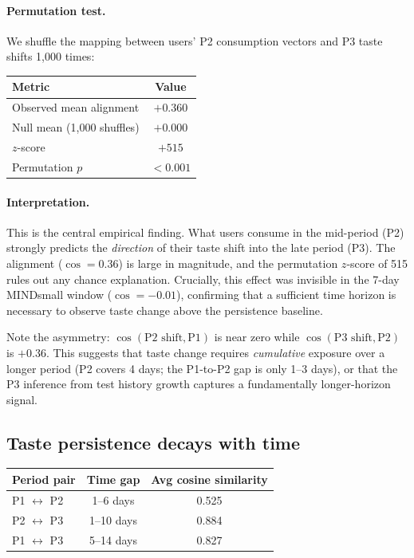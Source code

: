 \documentclass[11pt]{article}
\begin{document}
\paragraph{Permutation test.} We shuffle the mapping between users' P2 consumption vectors and P3 taste shifts 1,000 times:
\begin{center}
\begin{tabular}{lc}
\toprule
Metric & Value \\
\midrule
Observed mean alignment & $+0.360$ \\
Null mean (1,000 shuffles) & $+0.000$ \\
$z$-score & $+515$ \\
Permutation $p$ & $< 0.001$ \\
\bottomrule
\end{tabular}
\end{center}

\paragraph{Interpretation.} This is the central empirical finding. What users consume in the mid-period (P2) strongly predicts the \emph{direction} of their taste shift into the late period (P3). The alignment ($\cos = 0.36$) is large in magnitude, and the permutation $z$-score of 515 rules out any chance explanation. Crucially, this effect was invisible in the 7-day MINDsmall window ($\cos = -0.01$), confirming that a sufficient time horizon is necessary to observe taste change above the persistence baseline.

Note the asymmetry: $\cos(\text{P2 shift}, \text{P1})$ is near zero while $\cos(\text{P3 shift}, \text{P2})$ is $+0.36$. This suggests that taste change requires \emph{cumulative} exposure over a longer period (P2 covers 4 days; the P1-to-P2 gap is only 1--3 days), or that the P3 inference from test history growth captures a fundamentally longer-horizon signal.

\subsection{Taste persistence decays with time}

\begin{center}
\begin{tabular}{lcc}
\toprule
Period pair & Time gap & Avg cosine similarity \\
\midrule
P1 $\leftrightarrow$ P2 & 1--6 days & 0.525 \\
P2 $\leftrightarrow$ P3 & 1--10 days & 0.884 \\
P1 $\leftrightarrow$ P3 & 5--14 days & 0.827 \\
\bottomrule
\end{tabular}
\end{center}
\end{document}
